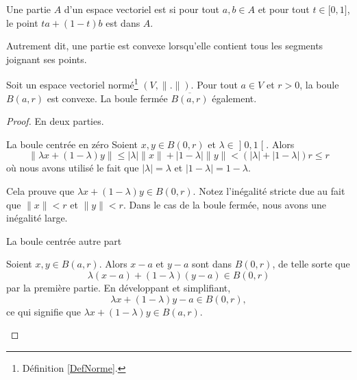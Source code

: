 \begin{definition}        \label{DEFooQQEOooAFKbcQ}
    Une partie \( A\) d'un espace vectoriel est  si pour tout \( a,b\in A\) et pour tout \( t\in \mathopen[ 0 , 1 \mathclose]\), le point \( ta+(1-t)b\) est dans \( A\).

    Autrement dit, une partie est convexe lorsqu'elle contient tous les segments joignant ses points.
\end{definition}

\begin{proposition}     \label{PROPooUQLUooDQfYLT}
    Soit un espace vectoriel normé\footnote{Définition \ref{DefNorme}.} \( (V,\| . \|)\). Pour tout \( a\in V\) et \( r>0\), la boule \( B(a,r)\) est convexe. La boule fermée \( \overline{ B(a,r) }\) également.
\end{proposition}

\begin{proof}
    En deux parties.
    \begin{subproof}
        \item[La boule centrée en zéro]
            Soient \( x,y\in B(0,r)\) et \( \lambda\in\mathopen] 0 , 1 \mathclose[\). Alors
                \begin{equation}
                    \| \lambda x+(1-\lambda)y \|\leq | \lambda |\| x \|+| 1-\lambda |\| y \|< (| \lambda | +| 1-\lambda |)r\leq r
                \end{equation}
                où nous avons utilisé le fait que \( | \lambda |=\lambda\) et \( | 1-\lambda |=1-\lambda\).

                Cela prouve que \( \lambda x+(1-\lambda)y\in B(0,r)\). Notez l'inégalité stricte due au fait que \( \| x \|<r\) et \( \| y \|<r\). Dans le cas de la boule fermée, nous avons une inégalité large.

            \item[La boule centrée autre part]

                Soient \( x,y\in B(a,r)\). Alors \( x-a\) et \( y-a\) sont dans \( B(0,r)\), de telle sorte que
                \begin{equation}
                    \lambda(x-a)+(1-\lambda)(y-a)\in B(0,r)
                \end{equation}
                par la première partie. En développant et simplifiant,
                \begin{equation}
                    \lambda x+(1-\lambda)y-a\in B(0,r),
                \end{equation}
                ce qui signifie que \( \lambda x+(1-\lambda)y\in B(a,r)\).
    \end{subproof}
\end{proof}

